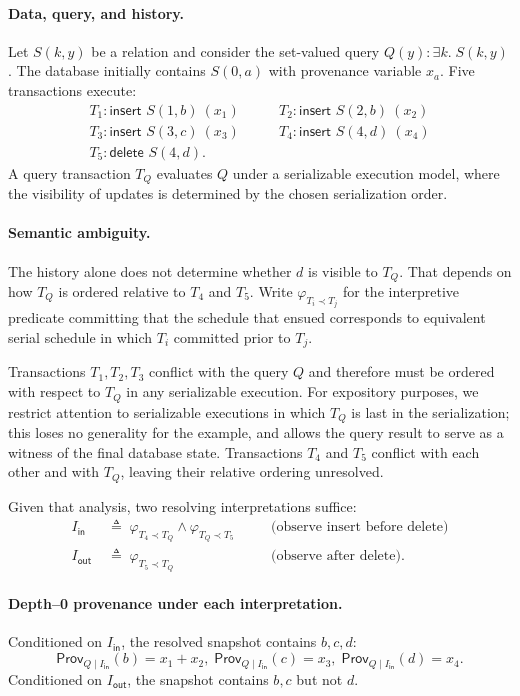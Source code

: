 \documentclass[acmsmall,nonacm]{acmart}
\theoremstyle{remark}
\numberwithin{definition}{section}
\numberwithin{theorem}{section}
\numberwithin{lemma}{section}
\numberwithin{corollary}{section}
\numberwithin{remark}{section}
\numberwithin{example}{section}
\numberwithin{observation}{section}
\numberwithin{assumption}{section}
\newcommand{\Prov}{\mathsf{Prov}}
\begin{document}
\paragraph{Data, query, and history.}
Let $S(k,y)$ be a relation and consider the set-valued query $Q(y) : \exists k.\; S(k,y)$.
The database initially contains $S(0,a)$ with provenance variable $x_a$.
Five transactions execute:
\[
\begin{array}{ll}
T_1: \textsf{insert } S(1,b) \ (x_1) \qquad &
T_2: \textsf{insert } S(2,b) \ (x_2)\\
T_3: \textsf{insert } S(3,c) \ (x_3) \qquad &
T_4: \textsf{insert } S(4,d) \ (x_4)\\
T_5: \textsf{delete } S(4,d). &
\end{array}
\]
A query transaction $T_Q$ evaluates $Q$ under a
serializable execution model, where the visibility of updates is
determined by the chosen serialization order.

\paragraph{Semantic ambiguity.}
The history alone does not determine whether $d$ is visible to $T_Q$.
That depends on how $T_Q$ is ordered relative to $T_4$ and $T_5$.
Write $\varphi_{T_i \prec T_j}$ for the interpretive predicate committing
that the schedule that ensued corresponds to equivalent serial schedule in which
$T_i$ committed prior to $T_j$.

Transactions $T_1,T_2,T_3$ conflict with the query $Q$ and therefore must
be ordered with respect to $T_Q$ in any serializable execution. 
For expository purposes, we restrict attention to serializable executions
in which $T_Q$ is last in the serialization; this loses no generality for
the example, and allows the query result to serve as a witness of the final
database state.
Transactions $T_4$ and $T_5$ conflict with each other and with $T_Q$,
leaving their relative ordering unresolved.

Given that analysis, two resolving interpretations suffice:
\[
\begin{aligned}
  I_{\mathsf{in}} &\;\triangleq\; \varphi_{T_4 \prec T_Q} \wedge \varphi_{T_Q \prec T_5} &&\quad\text{(observe insert before delete)}\\
  I_{\mathsf{out}} &\;\triangleq\; \varphi_{T_5 \prec T_Q} &&\quad\text{(observe after delete).}
\end{aligned}
\]

\paragraph{Depth--0 provenance under each interpretation.}
Conditioned on $I_{\mathsf{in}}$, the resolved snapshot contains $b,c,d$:
\[
  \Prov_{Q \mid I_{\mathsf{in}}}(b)=x_1+x_2,\;
  \Prov_{Q \mid I_{\mathsf{in}}}(c)=x_3,\;
  \Prov_{Q \mid I_{\mathsf{in}}}(d)=x_4.
\]
Conditioned on $I_{\mathsf{out}}$, the snapshot contains $b,c$ but not $d$.
\end{document}
